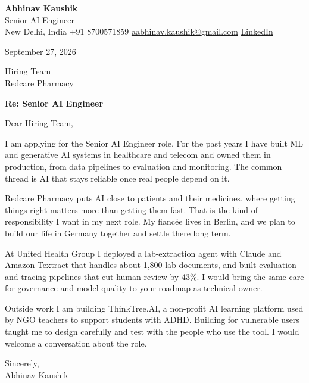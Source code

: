 \documentclass[11pt,a4paper]{article}
\begin{document}
{\Large\bfseries Abhinav Kaushik}\\
Senior AI Engineer\\
New Delhi, India \textbar{} +91 8700571859 \textbar{} \href{mailto:aabhinav.kaushik@gmail.com}{aabhinav.kaushik@gmail.com} \textbar{} \href{https://www.linkedin.com/in/abhinav-kaushik10/}{LinkedIn}  

September 27, 2026

Hiring Team\\
Redcare Pharmacy

\textbf{Re: Senior AI Engineer}

Dear Hiring Team,

I am applying for the Senior AI Engineer role. For the past years I have built ML and generative AI systems in healthcare and telecom and owned them in production, from data pipelines to evaluation and monitoring. The common thread is AI that stays reliable once real people depend on it.

Redcare Pharmacy puts AI close to patients and their medicines, where getting things right matters more than getting them fast. That is the kind of responsibility I want in my next role. My fiancée lives in Berlin, and we plan to build our life in Germany together and settle there long term.

At United Health Group I deployed a lab-extraction agent with Claude and Amazon Textract that handles about 1,800 lab documents, and built evaluation and tracing pipelines that cut human review by 43\%. I would bring the same care for governance and model quality to your roadmap as technical owner.

Outside work I am building ThinkTree.AI, a non-profit AI learning platform used by NGO teachers to support students with ADHD. Building for vulnerable users taught me to design carefully and test with the people who use the tool. I would welcome a conversation about the role.

Sincerely,\\[4pt]
Abhinav Kaushik
\end{document}
